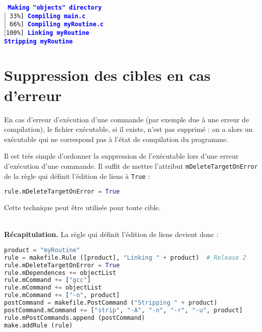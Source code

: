 \documentclass[a4paper,11pt]{extarticle}
\begin{document}
\begin{mdframed}[hidealllines=true,backgroundcolor=lightgray!20]
\tt\footnotesize
\textcolor{blue}{\bf Making "objects" directory}\\
$[$~33\%]~\textcolor{blue}{\bf Compiling main.c}\\
$[$~66\%]~\textcolor{blue}{\bf Compiling myRoutine.c}\\
$[$100\%]~\textcolor{blue}{\bf Linking myRoutine}\\
\hspace*{4em}\textcolor{blue}{\bf Stripping myRoutine}
\end{mdframed}







\section{Suppression des cibles en cas d'erreur}

En cas d'erreur d'exécution d'une commande (par exemple due à une erreur de compilation), le fichier exécutable, si il existe, n'est pas supprimé : on a alors un exécutable qui ne correspond pas à l'état de compilation du programme.

Il est très simple d'ordonner la suppression de l'exécutable lors d'une erreur d'exécution d'une commande. Il suffit de mettre l'attribut \texttt{mDeleteTargetOnError} de la règle qui définit l'édition de liens à \texttt{True} :
\begin{lstlisting}[language=py]
rule.mDeleteTargetOnError = True
\end{lstlisting}
Cette technique peut être utilisée pour toute cible.

~\\{\bf Récapitulation.} La règle qui définit l'édition de liens devient donc :
\begin{lstlisting}[language=py]
product = "myRoutine"
rule = makefile.Rule ([product], "Linking " + product)  # Release 2
rule.mDeleteTargetOnError = True
rule.mDependences += objectList
rule.mCommand += ["gcc"]
rule.mCommand += objectList
rule.mCommand += ["-o", product]
postCommand = makefile.PostCommand ("Stripping " + product)
postCommand.mCommand += ["strip", "-A", "-n", "-r", "-u", product]
rule.mPostCommands.append (postCommand)
make.addRule (rule)
\end{lstlisting}
\end{document}
